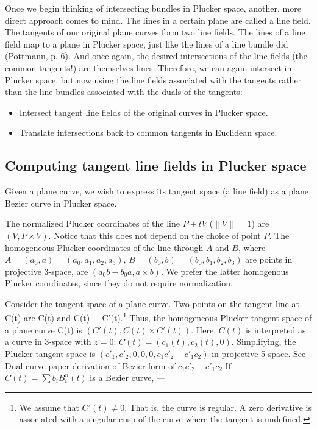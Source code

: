 \documentclass[11pt]{article}
\begin{document}
Once we begin thinking of intersecting bundles in Plucker space, 
another, more direct approach comes to mind.
The lines in a certain plane are called a line field.
The tangents of our original plane curves form two line fields.
The lines of a line field map to a plane in Plucker space, just like
the lines of a line bundle did (Pottmann, p. 6).
And once again, the desired intersections of the line fields (the common tangents!)
are themselves lines.
Therefore, we can again intersect in Plucker space, but now using
the line fields associated with the tangents rather than the line bundles
associated with the duals of the tangents:

\begin{itemize}
\item	Intersect tangent line fields of the original curves in Plucker space.
\item   Translate intersections back to common tangents in Euclidean space.
\end{itemize}

\subsection{Computing tangent line fields in Plucker space}

Given a plane curve, we wish to express its tangent space
(a line field) as a plane Bezier curve in Plucker space.

The normalized Plucker coordinates of the line $P+tV$ ($\|V\|=1$) are
$(V,P \times V)$.  Notice that this does not depend on the choice of
point $P$.
The homogeneous Plucker coordinates of the line through $A$ and $B$,
where $A = (a_0,a) = (a_0,a_1,a_2,a_3)$, 
      $B = (b_0,b) = (b_0,b_1,b_2,b_3)$ are points in projective 3-space,
are $(a_0 b - b_0 a, a \times b)$.
We prefer the latter homogenous Plucker coordinates, since they do 
not require normalization.

Consider the tangent space of a plane curve.
Two points on the tangent line at C(t) are C(t) and C(t) + C'(t).\footnote{We
	assume that $C'(t) \neq 0$.  That is, the curve
	is regular.  A zero derivative is associated with a
	singular cusp of the curve where the tangent is undefined.}
Thus, the homogeneous Plucker tangent space of a plane curve C(t) is
$(C'(t), C(t) \times C'(t))$.
Here, $C(t)$ is interpreted as a curve in 3-space with $z=0$:
$C(t) = (c_1(t),c_2(t),0)$.
Simplifying, the Plucker tangent space is 
$(c'_1, c'_2, 0, 0, 0, c_1c'_2 - c'_1c_2)$ in projective 5-space.
See Dual curve paper derivation of Bezier form of $c_1c'_2 - c'_1c_2$
If $C(t) = \sum b_i B_i^n(t)$ is a Bezier curve, ---
\end{document}
